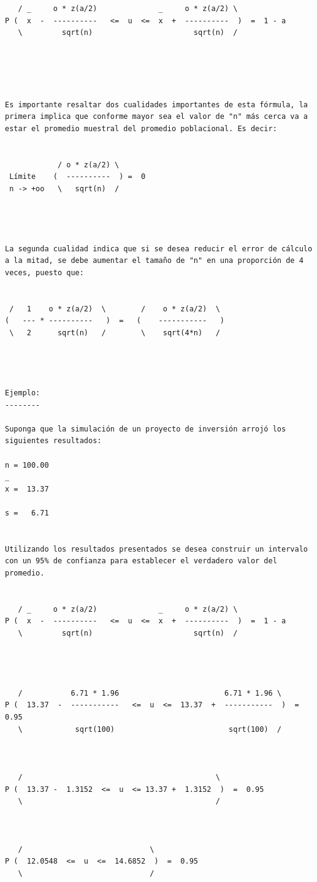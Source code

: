 \begin{verbatim}
   / _     o * z(a/2)              _     o * z(a/2) \
P (  x  -  ----------   <=  u  <=  x  +  ----------  )  =  1 - a
   \         sqrt(n)                       sqrt(n)  /





Es importante resaltar dos cualidades importantes de esta fórmula, la primera implica que conforme mayor sea el valor de "n" más cerca va a estar el promedio muestral del promedio poblacional. Es decir:

          
            / o * z(a/2) \
 Límite    (  ----------  ) =  0
 n -> +oo   \   sqrt(n)  /
                           



La segunda cualidad indica que si se desea reducir el error de cálculo a la mitad, se debe aumentar el tamaño de "n" en una proporción de 4 veces, puesto que:


 /   1    o * z(a/2)  \        /    o * z(a/2)  \
(   --- * ----------   )  =   (    -----------   )
 \   2      sqrt(n)   /        \    sqrt(4*n)   /




Ejemplo:
--------

Suponga que la simulación de un proyecto de inversión arrojó los siguientes resultados:

n = 100.00
_
x =  13.37

s =   6.71


Utilizando los resultados presentados se desea construir un intervalo con un 95% de confianza para establecer el verdadero valor del promedio.


   / _     o * z(a/2)              _     o * z(a/2) \
P (  x  -  ----------   <=  u  <=  x  +  ----------  )  =  1 - a
   \         sqrt(n)                       sqrt(n)  /




   /           6.71 * 1.96                        6.71 * 1.96 \
P (  13.37  -  -----------   <=  u  <=  13.37  +  -----------  )  =  0.95
   \            sqrt(100)                          sqrt(100)  /



   /                                            \
P (  13.37 -  1.3152  <=  u  <= 13.37 +  1.3152  )  =  0.95
   \                                            /



   /                             \
P (  12.0548  <=  u  <=  14.6852  )  =  0.95
   \                             /





\end{verbatim}
